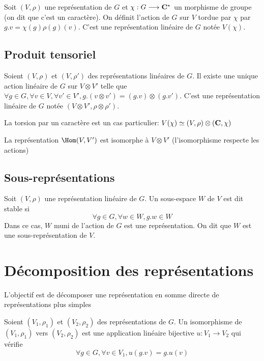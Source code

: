 Soit  $(V, \rho)$ une représentation de  $G$ et  $\chi : G \longrightarrow  \mathbf C^\star$ un morphisme de groupe (on dit que c'est un caractère). On définit l'action de $G$ sur  $V$ tordue par  $\chi$ par  $g.v=\chi(g)\rho(g)(v)$. C'est une représentation linéaire de  $G$ notée  $V(\chi)$.

\subsection{Produit tensoriel}

Soient $(V, \rho)$ et  $(V, \rho')$ des représentations linéaires de  $G$. Il existe une unique action linéaire de  $G$ sur  $V\otimes V'$ telle que  $\forall  g \in  G, \forall  v \in  V, \forall  v' \in  V', g.(v\otimes v')=(g.v)\otimes (g.v')$. C'est une représentation linéaire de $G$ notée  $(V\otimes V', \rho\otimes \rho')$.

\begin{rem}
    La torsion par un caractère est un cas particulier: $V(\chi) \simeq (V, \rho)\otimes (\mathbf C, \chi)$
\end{rem}

\begin{rem}
    La représentation $\Hom(V, V')$ est isomorphe à  $V\otimes V'$ (l'isomorphisme respecte les actions)
\end{rem}

\subsection{Sous-représentations}

\begin{dfn}
    Soit $(V, \rho)$ une représentation linéaire de  $G$. Un sous-espace  $W$ de  $V$ est dit stable si  \[
    \forall  g \in  G, \forall  w \in  W, g.w \in  W
    \] 
    Dans ce cas, $W$ muni de l'action de  $G$ est une représentation. On dit que  $W$ est une sous-représentation de  $V$.
\end{dfn}

\section{Décomposition des représentations}

L'objectif est de décomposer une représentation en somme directe de représentations plus simples

\begin{dfn}
    Soient $(V_1, \rho_1)$ et  $(V_2, \rho_2)$ des représentations de  $G$. Un isomorphisme de  $(V_1, \rho_1)$ vers $(V_2, \rho_2)$ est une application linéaire bijective $u : V_1 \longrightarrow  V_2$ qui vérifie \[
        \forall  g \in  G, \forall  v \in  V_1, u(g.v)=g.u(v)
    \] 
\end{dfn}

